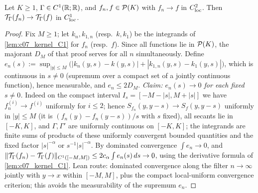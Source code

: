 \begin{lemma}
  \label{lem:c07_kernel_continuity}
  Let $K\geq1$, $\Gamma\in C^1(\mathbb{R};\mathbb{R})$, and $f_n,f\in\mathcal{P}(K)$ with $f_n\to f$ in $C^2_{\textup{loc}}$. Then
  $\mathcal{T}_\Gamma(f_n)\to\mathcal{T}_\Gamma(f)$ in $C^1_{\textup{loc}}$.
\end{lemma}
\begin{proof}
  Fix $M\ge1$; let $k_n,k_{1,n}$ (resp.\ $k,k_1$) be the integrands of \cref{lem:c07_kernel_C1} for
  $f_n$ (resp.\ $f$). Since all functions lie in $\mathcal{P}(K)$, the majorant $D_M$ of that proof
  serves for all $n$ simultaneously. Define
  $e_n(s):=\sup_{|y|\le M}\bigl(|k_n(y,s)-k(y,s)|+|k_{1,n}(y,s)-k_1(y,s)|\bigr)$, which is continuous
  in $s\ne0$ (supremum over a compact set of a jointly continuous function), hence measurable,
  and $e_n\le 2D_M$. \emph{Claim: $e_n(s)\to0$ for each fixed $s\ne0$.} Indeed on the compact
  interval $I_s=[-M-|s|,M+|s|]$ we have $f_n^{(i)}\to f^{(i)}$ uniformly for $i\le2$; hence
  $S_{f_n}(y,y-s)\to S_f(y,y-s)$ uniformly in $|y|\le M$ (it is $(f_n(y)-f_n(y-s))/s$ with $s$
  fixed), all secants lie in $[-K,K]$, and $\Gamma,\Gamma'$ are uniformly continuous on $[-K,K]$;
  the integrands are finite sums of products of these uniformly convergent bounded quantities and
  the fixed factor $|s|^{-\alpha}$ or $s^{-1}|s|^{-\alpha}$. By dominated convergence
  $\int e_n\to0$, and
  $\|\mathcal{T}_\Gamma(f_n)-\mathcal{T}_\Gamma(f)\|_{C^1([-M,M])}\le 2c_\alpha\int e_n(s)\,ds\to0$, using the derivative
  formula of \cref{lem:c07_kernel_C1}.
  Lean route: dominated convergence along the filter $n\to\infty$ jointly with $y\to x$ within $[-M,M]$, plus the compact local-uniform convergence criterion; this avoids the measurability of the supremum $e_n$.
\end{proof}

